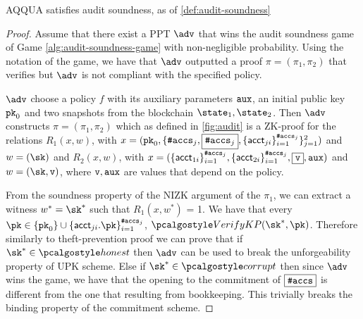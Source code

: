 
\begin{theorem}
    AQQUA satisfies audit soundness, as of \autoref{def:audit-soundness}
\end{theorem}
\begin{proof}
    Assume that there exist a PPT $\adv$ that wins the audit soundness game of Game \ref{alg:audit-soundness-game} with non-negligible probability. Using the notation of the game, we have that $\adv$ outputted a proof $\pi = (\pi_1, \pi_2)$ that verifies but $\adv$ is not compliant with the specified policy.
    

    $\adv$ choose a policy $f$ with its auxiliary parameters ${\textup{\texttt{aux}}}$, an initial public key $\textup{\texttt{pk}}_{0}$ and two snapshots from the blockchain $\snap_{1}, \snap_{2}$. Then $\adv$ constructs $\pi = (\pi_1, \pi_2)$ which as defined in \autoref{fig:audit} is a ZK-proof for the relations $R_1(x,w)$, with $x=(\textup{\texttt{pk}}_{0}, \{ \textup{\texttt{\#accs}}_j, {\fbox{$\textup{\texttt{\#accs}}_{j}$}}, \{ \textup{\textsf{acct}}_{ji} \}_{i=1}^{\textup{\texttt{\#accs}}_j}\}_{j=1}^{2})$ and $w=(\sk)$ and $R_2(x,w)$, with $x=(\{ \textup{\textsf{acct}}_{1i} \}_{i=1}^{\textup{\texttt{\#accs}}_j}, \{ \textup{\textsf{acct}}_{2i} \}_{i=1}^{\textup{\texttt{\#accs}}_j}, \fbox{$\texttt{v}$}, {\textup{\texttt{aux}}})$ and $w=(\sk, \v)$, where $\texttt{v}, {\textup{\texttt{aux}}}$ are values that depend on the policy.

    From the soundness property of the NIZK argument of the $\pi_1$, we can extract a witness $w^* = \sk^*$ such that $R_1(x, w^*)$ = 1. We have that every $\pk \in \{\inpk\} \cup \{\acct_{ji}.\pk\}_{i=1}^{\numaccs_j}$,  $\verkp(\sk^*, \pk)$. Therefore similarly to theft-prevention proof we can prove that if $\sk^* \in \honest$ then $\adv$ can be used to break the unforgeability property of UPK scheme. Else if $\sk^* \in \corrupt$ then since $\adv$ wins the game, we have that the opening to the commitment of $\fbox{$\textup{\texttt{\#accs}}$}$ is different from the one that resulting from bookkeeping. This trivially breaks the binding property of the commitment scheme.


\end{proof}
